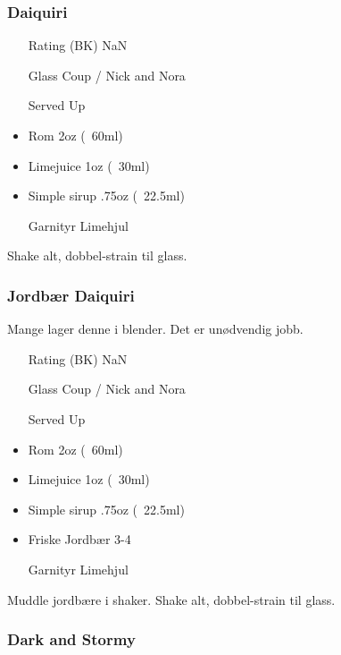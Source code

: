 \subsubsection{Daiquiri}
\begin{itemize}
    \item[Rating (BK)] NaN
    \item[Glass] Coup / Nick and Nora
    \item[Served] Up
    \item Rom 2oz (~60ml)
    \item Limejuice 1oz (~30ml)
    \item Simple sirup .75oz (~22.5ml)
    \item[Garnityr] Limehjul
\end{itemize}
Shake alt, dobbel-strain til glass.

\subsubsection{Jordbær Daiquiri}
Mange lager denne i blender. Det er unødvendig jobb.
\begin{itemize}
    \item[Rating (BK)] NaN
    \item[Glass] Coup / Nick and Nora
    \item[Served] Up
    \item Rom 2oz (~60ml)
    \item Limejuice 1oz (~30ml)
    \item Simple sirup .75oz (~22.5ml)
    \item Friske Jordbær 3-4
    \item[Garnityr] Limehjul
\end{itemize}
Muddle jordbære i shaker. Shake alt, dobbel-strain til glass.

\subsubsection{Dark and Stormy}
